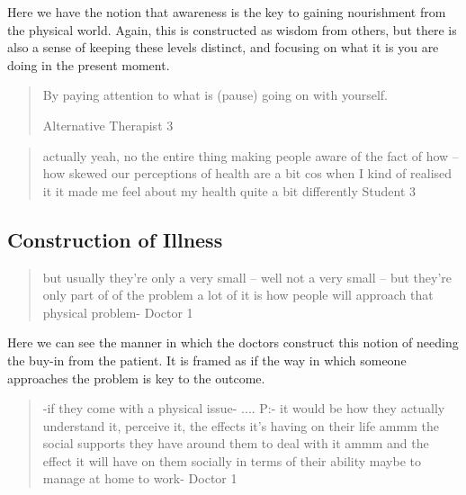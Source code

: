 Here we have the notion that awareness is the key to gaining nourishment from the physical world. Again, this is constructed as wisdom from others, but there is also a sense of keeping these levels distinct, and focusing on what it is you are doing in the present moment. 

\begin{quotation}
  
By paying attention to what is (pause) going on with yourself.

Alternative Therapist 3
\end{quotation}

\begin{quotation}
  actually yeah, no the entire thing making people aware of the fact of how – how skewed our perceptions of health are a bit cos when I kind of realised it it made me feel about my health quite a bit differently
Student 3
\end{quotation}




\subsection{Construction of Illness}
\label{sec:construction-illness}

\begin{quotation}
  but usually they're only a very small – well not a very small – but they're only part of of the problem a lot of it is how people will approach that physical problem-
Doctor 1
\end{quotation}

Here  we can see the manner in which the doctors construct this notion of needing the buy-in from the patient. It is framed as if the way in which someone approaches the problem is key to the outcome. 

\begin{quotation}
  -if they come with a physical issue-
....
P:- it would be how they actually understand it, perceive it, the effects it's having on their life ammm the social supports they have around them to deal with it ammm and the effect it will have on them socially in terms of their ability maybe to manage at home to work-
Doctor 1
\end{quotation}

